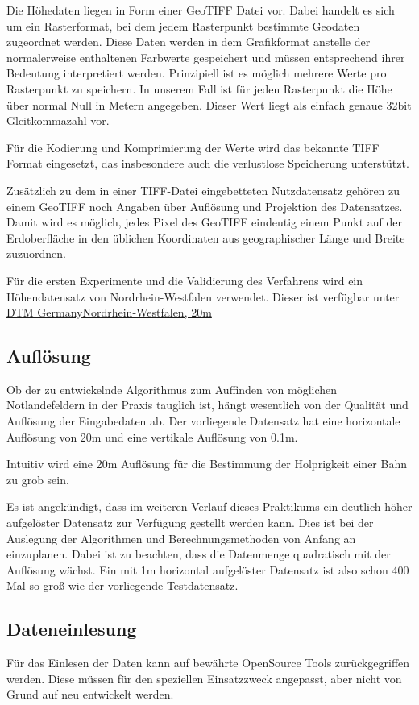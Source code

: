 \documentclass[
11pt, %
a4paper, %
oneside, %
pdfspacing, %
headinclude,
BCOR5mm, %
ngerman, %
bibtotocnumbered,
]{scrartcl}
\begin{document}
Die Höhedaten liegen in Form einer GeoTIFF Datei vor. Dabei handelt es sich um ein Rasterformat, bei dem jedem Rasterpunkt bestimmte Geodaten zugeordnet werden. Diese Daten werden in dem Grafikformat anstelle der normalerweise enthaltenen Farbwerte gespeichert und müssen entsprechend ihrer Bedeutung interpretiert werden. Prinzipiell ist es möglich mehrere Werte pro Rasterpunkt zu speichern. In unserem Fall ist für jeden Rasterpunkt die Höhe über normal Null in Metern angegeben. Dieser Wert liegt als einfach genaue 32bit Gleitkommazahl vor.

Für die Kodierung und Komprimierung der Werte wird das bekannte TIFF Format eingesetzt, das insbesondere auch die verlustlose Speicherung unterstützt.

Zusätzlich zu dem in einer TIFF-Datei eingebetteten Nutzdatensatz gehören zu einem GeoTIFF noch Angaben über Auflösung und Projektion des Datensatzes. Damit wird es möglich, jedes Pixel des GeoTIFF eindeutig einem Punkt auf der Erdoberfläche in den üblichen Koordinaten aus geographischer Länge und Breite zuzuordnen.

Für die ersten Experimente und die Validierung des Verfahrens wird ein Höhendatensatz von Nordrhein-Westfalen verwendet. Dieser ist verfügbar unter \href{http://data.opendataportal.at/dataset/dtm-germany/resource/08d8c183-a4cc-4a7b-84a0-d03f92076ed3}{DTM Germany\textunderscore Nordrhein-Westfalen, 20m}


	\subsection{Auflösung}
	Ob der zu entwickelnde Algorithmus zum Auffinden von möglichen Notlandefeldern in der Praxis tauglich ist, hängt wesentlich von der Qualität und Auflösung der Eingabedaten ab. Der vorliegende Datensatz hat eine horizontale Auflösung von 20m und eine vertikale Auflösung von 0.1m. 
	
	Intuitiv wird eine 20m Auflösung für die Bestimmung der Holprigkeit einer Bahn zu grob sein. 
	
	Es ist angekündigt, dass im weiteren Verlauf dieses Praktikums ein deutlich höher aufgelöster Datensatz zur Verfügung gestellt werden kann. Dies ist bei der Auslegung der Algorithmen und Berechnungsmethoden von Anfang an einzuplanen. Dabei ist zu beachten, dass die Datenmenge quadratisch mit der Auflösung wächst. Ein mit 1m horizontal aufgelöster Datensatz ist also schon 400 Mal so groß wie der vorliegende Testdatensatz.
	
	\subsection{Dateneinlesung}
	Für das Einlesen der Daten kann auf bewährte OpenSource Tools zurückgegriffen werden. Diese müssen für den speziellen Einsatzzweck angepasst, aber nicht von Grund auf neu entwickelt werden.
	
\end{document}
